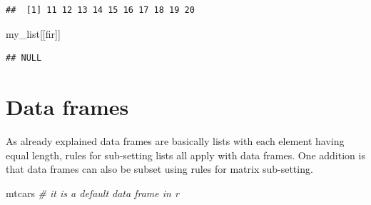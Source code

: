 \documentclass[
]{book}
\newenvironment{Shaded}{\begin{snugshade}}{\end{snugshade}}
\newcommand{\CommentTok}[1]{\textcolor[rgb]{0.56,0.35,0.01}{\textit{#1}}}
\newcommand{\NormalTok}[1]{#1}
\newcommand{\StringTok}[1]{\textcolor[rgb]{0.31,0.60,0.02}{#1}}
\begin{document}
\begin{verbatim}
##  [1] 11 12 13 14 15 16 17 18 19 20
\end{verbatim}

\begin{Shaded}
\begin{Highlighting}[]
\NormalTok{my\_list[[}\StringTok{\textquotesingle{}fir\textquotesingle{}}\NormalTok{]]}
\end{Highlighting}
\end{Shaded}

\begin{verbatim}
## NULL
\end{verbatim}

\hypertarget{data-frames}{%
\section{Data frames}\label{data-frames}}

As already explained data frames are basically lists with each element having equal length, rules for sub-setting lists all apply with data frames. One addition is that data frames can also be subset using rules for matrix sub-setting.

\begin{Shaded}
\begin{Highlighting}[]
\NormalTok{mtcars }\CommentTok{\# it is a default data frame in r}
\end{Highlighting}
\end{Shaded}
\end{document}
